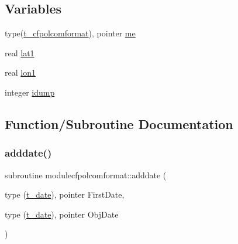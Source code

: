 \subsection*{Variables}
\begin{DoxyCompactItemize}
\item 
type(\mbox{\hyperlink{structmodulecfpolcomformat_1_1t__cfpolcomformat}{t\+\_\+cfpolcomformat}}), pointer \mbox{\hyperlink{namespacemodulecfpolcomformat_acc4b6f01dd43793f860ce27c79504f03}{me}}
\item 
real \mbox{\hyperlink{namespacemodulecfpolcomformat_a85fafebe9ec21f0fc121f3b22fa92f9f}{lat1}}
\item 
real \mbox{\hyperlink{namespacemodulecfpolcomformat_acab89e37f464dc663bc89df656d0b6e5}{lon1}}
\item 
integer \mbox{\hyperlink{namespacemodulecfpolcomformat_a2b38a369c5d65b6539825294901a7f82}{idump}}
\end{DoxyCompactItemize}


\subsection{Function/\+Subroutine Documentation}
\mbox{\label{namespacemodulecfpolcomformat_a06c01fa0bdcd286b18e4131ebf80a3fe}} 
\subsubsection{\texorpdfstring{adddate()}{adddate()}}
{\footnotesize\ttfamily subroutine modulecfpolcomformat\+::adddate (\begin{DoxyParamCaption}\item[{type (\mbox{\hyperlink{structmodulecfpolcomformat_1_1t__date}{t\+\_\+date}}), pointer}]{First\+Date,  }\item[{type (\mbox{\hyperlink{structmodulecfpolcomformat_1_1t__date}{t\+\_\+date}}), pointer}]{Obj\+Date }\end{DoxyParamCaption})\hspace{0.3cm}{\ttfamily [private]}}

